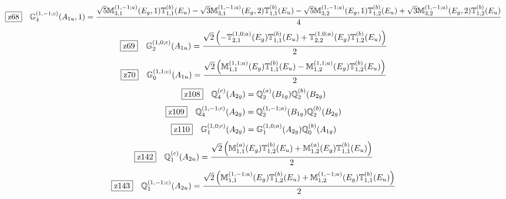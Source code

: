 \documentclass[fleqn,10pt,landscape]{jsarticle}
\begin{document}
\begin{dmath*}
\hspace*{3mm}\fbox{z68}\quad \mathbb{G}_{4}^{(1,-1;c)}(A_{1u},1)=\frac{\sqrt{5} \mathbb{M}_{3,1}^{(1,-1;a)}(E_{g},1) \mathbb{T}_{1,1}^{(b)}(E_{u}) - \sqrt{3} \mathbb{M}_{3,1}^{(1,-1;a)}(E_{g},2) \mathbb{T}_{1,1}^{(b)}(E_{u}) - \sqrt{5} \mathbb{M}_{3,2}^{(1,-1;a)}(E_{g},1) \mathbb{T}_{1,2}^{(b)}(E_{u}) + \sqrt{3} \mathbb{M}_{3,2}^{(1,-1;a)}(E_{g},2) \mathbb{T}_{1,2}^{(b)}(E_{u})}{4}
\end{dmath*}
\begin{dmath*}
\hspace*{3mm}\fbox{z69}\quad \mathbb{G}_{2}^{(1,0;c)}(A_{1u})=\frac{\sqrt{2} \left(- \mathbb{T}_{2,1}^{(1,0;a)}(E_{g}) \mathbb{T}_{1,1}^{(b)}(E_{u}) + \mathbb{T}_{2,2}^{(1,0;a)}(E_{g}) \mathbb{T}_{1,2}^{(b)}(E_{u})\right)}{2}
\end{dmath*}
\begin{dmath*}
\hspace*{3mm}\fbox{z70}\quad \mathbb{G}_{0}^{(1,1;c)}(A_{1u})=\frac{\sqrt{2} \left(\mathbb{M}_{1,1}^{(1,1;a)}(E_{g}) \mathbb{T}_{1,1}^{(b)}(E_{u}) - \mathbb{M}_{1,2}^{(1,1;a)}(E_{g}) \mathbb{T}_{1,2}^{(b)}(E_{u})\right)}{2}
\end{dmath*}
\begin{dmath*}
\hspace*{3mm}\fbox{z108}\quad \mathbb{Q}_{4}^{(c)}(A_{2g})=\mathbb{Q}_{2}^{(a)}(B_{1g}) \mathbb{Q}_{2}^{(b)}(B_{2g})
\end{dmath*}
\begin{dmath*}
\hspace*{3mm}\fbox{z109}\quad \mathbb{Q}_{4}^{(1,-1;c)}(A_{2g})=\mathbb{Q}_{2}^{(1,-1;a)}(B_{1g}) \mathbb{Q}_{2}^{(b)}(B_{2g})
\end{dmath*}
\begin{dmath*}
\hspace*{3mm}\fbox{z110}\quad \mathbb{G}_{1}^{(1,0;c)}(A_{2g})=\mathbb{G}_{1}^{(1,0;a)}(A_{2g}) \mathbb{Q}_{0}^{(b)}(A_{1g})
\end{dmath*}
\begin{dmath*}
\hspace*{3mm}\fbox{z142}\quad \mathbb{Q}_{1}^{(c)}(A_{2u})=\frac{\sqrt{2} \left(\mathbb{M}_{1,1}^{(a)}(E_{g}) \mathbb{T}_{1,2}^{(b)}(E_{u}) + \mathbb{M}_{1,2}^{(a)}(E_{g}) \mathbb{T}_{1,1}^{(b)}(E_{u})\right)}{2}
\end{dmath*}
\begin{dmath*}
\hspace*{3mm}\fbox{z143}\quad \mathbb{Q}_{1}^{(1,-1;c)}(A_{2u})=\frac{\sqrt{2} \left(\mathbb{M}_{1,1}^{(1,-1;a)}(E_{g}) \mathbb{T}_{1,2}^{(b)}(E_{u}) + \mathbb{M}_{1,2}^{(1,-1;a)}(E_{g}) \mathbb{T}_{1,1}^{(b)}(E_{u})\right)}{2}
\end{dmath*}
\end{document}
